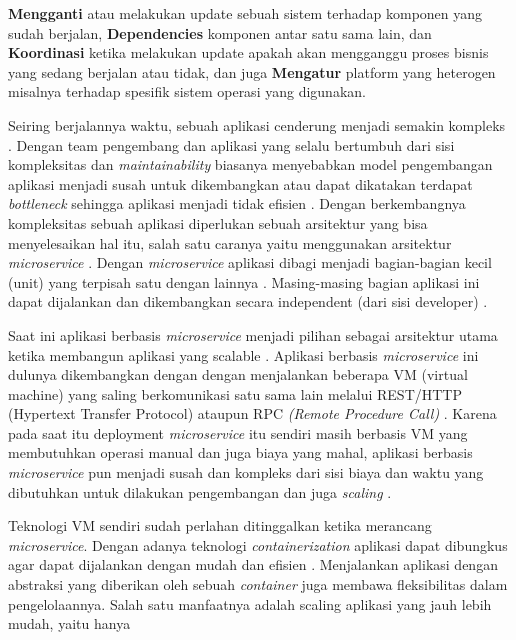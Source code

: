 \textbf{Mengganti} atau melakukan update sebuah sistem terhadap komponen yang sudah berjalan,
\textbf{Dependencies} komponen antar satu sama lain, dan
\textbf{Koordinasi} ketika melakukan update apakah akan mengganggu proses bisnis yang sedang berjalan atau tidak, dan juga
\textbf{Mengatur} platform yang heterogen misalnya terhadap spesifik sistem operasi yang digunakan.
\par
Seiring berjalannya waktu, sebuah aplikasi cenderung menjadi semakin  kompleks  \cite{Tania2014, Newman2015}.
Dengan team pengembang dan aplikasi yang selalu bertumbuh  dari sisi kompleksitas dan \textit{maintainability} biasanya
menyebabkan model  pengembangan aplikasi menjadi susah untuk dikembangkan atau dapat dikatakan  terdapat \textit{bottleneck}
sehingga aplikasi menjadi tidak efisien  \cite{Yale2016}. Dengan berkembangnya kompleksitas sebuah aplikasi diperlukan
sebuah arsitektur yang  bisa menyelesaikan hal itu, salah satu caranya yaitu menggunakan arsitektur \textit{microservice}  \cite{Tania2014}.
Dengan \textit{microservice} aplikasi dibagi menjadi bagian-bagian kecil (unit) yang terpisah satu dengan lainnya  \cite{Tania2014}.
Masing-masing bagian aplikasi ini  dapat dijalankan dan dikembangkan secara independent (dari sisi developer)  \cite{Xiao2017}.
\par
Saat ini aplikasi berbasis \textit{microservice} menjadi pilihan sebagai arsitektur utama ketika
membangun aplikasi yang scalable  \cite{Wu2014}. Aplikasi berbasis \textit{microservice} ini
dulunya dikembangkan dengan dengan menjalankan beberapa VM  (virtual machine)
yang saling berkomunikasi satu sama lain melalui REST/HTTP  (Hypertext Transfer Protocol)
ataupun RPC \textit{(Remote Procedure Call)}  \cite{Khazaei2016}. Karena  pada saat itu deployment \textit{microservice} itu sendiri
masih berbasis VM yang  membutuhkan operasi manual dan juga biaya yang mahal, aplikasi berbasis
\textit{microservice} pun menjadi susah dan kompleks dari sisi biaya dan waktu yang  dibutuhkan untuk dilakukan
pengembangan dan juga \textit{scaling}  \cite{Khazaei2016} .
\par
\newpage
Teknologi VM sendiri sudah perlahan ditinggalkan ketika merancang \textit{microservice}.
Dengan adanya teknologi \textit{containerization} aplikasi dapat dibungkus agar dapat dijalankan dengan mudah dan efisien  \cite{Khazaei2016}.
Menjalankan aplikasi dengan  abstraksi yang diberikan oleh sebuah \textit{container} juga membawa fleksibilitas
dalam  pengelolaannya. Salah satu manfaatnya adalah scaling aplikasi yang jauh lebih  mudah, yaitu hanya
